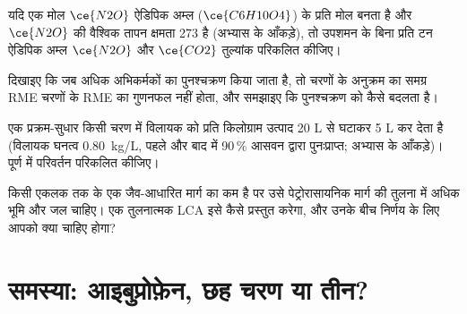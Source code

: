 \begin{exercise}[$\star\star$]\label{exo:b3:green-industrial:9}
यदि एक मोल $\ce{N2O}$ ऐडिपिक अम्ल ($\ce{C6H10O4}$) के प्रति मोल बनता है और $\ce{N2O}$ की वैश्विक तापन
क्षमता 273 है (अभ्यास के आँकड़े), तो उपशमन के बिना प्रति टन ऐडिपिक अम्ल $\ce{N2O}$ और $\ce{CO2}$ तुल्यांक
परिकलित कीजिए।
\end{exercise}

\begin{exercise}[$\star\star\star$]\label{exo:b3:green-industrial:10}
दिखाइए कि जब अधिक अभिकर्मकों का पुनश्चक्रण किया जाता है, तो चरणों के अनुक्रम का समग्र RME
चरणों के RME का गुणनफल नहीं होता, और समझाइए कि पुनश्चक्रण
 को कैसे बदलता है।
\end{exercise}

\begin{exercise}[$\star\star\star$]\label{exo:b3:green-industrial:11}
एक प्रक्रम-सुधार किसी चरण में विलायक को प्रति किलोग्राम उत्पाद 20 L से घटाकर 5 L
कर देता है (विलायक घनत्व \qty{0.80}{kg/L}, पहले और बाद में 90\,\% आसवन द्वारा पुनःप्राप्त; अभ्यास के
आँकड़े)। पूर्ण  में परिवर्तन परिकलित कीजिए।
\end{exercise}

\begin{exercise}[$\star\star\star$]\label{exo:b3:green-industrial:12}
किसी एकलक तक के एक जैव-आधारित मार्ग का  कम है पर उसे
पेट्रोरासायनिक मार्ग की तुलना में अधिक भूमि और जल चाहिए। एक तुलनात्मक LCA इसे कैसे प्रस्तुत करेगा,
और उनके बीच निर्णय के लिए आपको क्या चाहिए होगा?
\end{exercise}

\section{समस्या: आइबुप्रोफ़ेन, छह चरण या तीन?}

